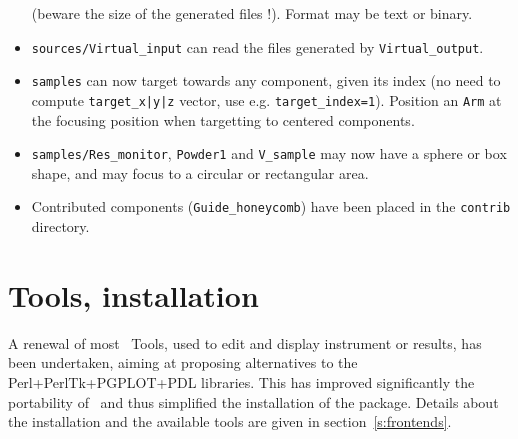 \begin{itemize}
    (beware the size of the generated files !). Format may be text or binary.
\item \verb+sources/Virtual_input+ can read the files generated by \verb+Virtual_output+.
\item \verb+samples+ can now target towards any component, given its index 
    (no need to compute \verb+target_x|y|z+ vector, use e.g. \verb+target_index=1+). 
    Position an \verb+Arm+ at the focusing position when targetting to 
    centered components.
\item \verb+samples/Res_monitor+, \verb+Powder1+ and \verb+V_sample+ may now have a
    sphere or box shape, and may focus to a circular or rectangular area.
\item Contributed components (\verb+Guide_honeycomb+) have been
    placed in the \verb+contrib+ directory. 
\end{itemize}

\section{Tools, installation}
\label{s:new-features:tools}
  A renewal of most \MCS\ Tools, used to edit and display instrument or results, 
  has been undertaken, aiming at proposing alternatives to the Perl+PerlTk+PGPLOT+PDL 
  libraries.
  This has improved significantly the portability of \MCS\ and thus simplified the
  installation of the package. Details about the installation and the available tools are given in section~\ref{s:frontends}.

